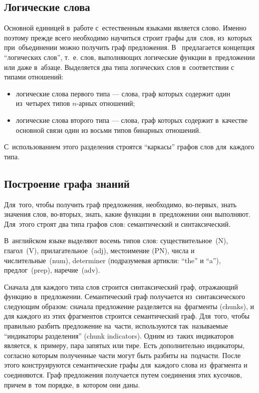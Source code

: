 
\subsection {Логические слова}

Основной единицей в~работе с~естественным языками является слово.
Именно поэтому прежде всего необходимо научиться  строит графы для~слов, 
из~которых при~объединении можно получить граф предложения.
В~\cite{knowledge_graph} предлагается концепция ``логических слов'', т.~е.
слов, выполняющих логические функции в~предложении или даже в~абзаце.
Выделяется два типа логических слов в~соответствии с типами отношений:

\begin{itemize}

\item{
логические слова первого типа --- слова, граф которых содержит один из~четырех типов $n$-арных отношений;
}

\item{
логические слова второго типа --- слова, граф которых содержит в~качестве основной связи один из восьми типов 
бинарных отношений.
}

\end {itemize}

С~использованием этого разделения строятся ``каркасы'' графов слов для~каждого типа. 

\subsection {Построение графа знаний}

Для~того, чтобы получить граф предложения, необходимо, 
во-первых,  знать значения слов,
во-вторых, знать, какие функции в~предложении они выполняют. 
Для~этого строят два типа графов слов: семантический и синтаксический.

В~английском языке выделяют восемь типов слов: 
существительное~(N), 
глагол~(V), 
прилагательное~(adj),
местоимение (PN), 
числа и числительные~(num), 
determiner (подразумевая артикли: ``the'' и ``a''), 
предлог~(prep),
наречие~(adv).

Сначала для каждого типа слов строится синтаксический граф, отражающий функцию в~предложении.
Семантический граф получается из~синтаксического следующим образом: 
сначала предложение разделяется на~фрагменты (chunks), и для каждого из этих фрагментов строится семантический граф. 
Для~того, чтобы правильно разбить предложение на~части,  используются так~называемые ``индикаторы разделения'' (chunk indicators). 
Одним из~таких индикаторов является, к~примеру, пара запятых или тире. 
Есть дополнительно индикаторы, согласно которым полученные части могут быть разбиты на~подчасти.
После этого конструируются семантические графы для~каждого слова из~фрагмента и соединяются.
Граф предложения получается путем соединения этих кусочков, причем в~том порядке, 
в~котором они даны.

